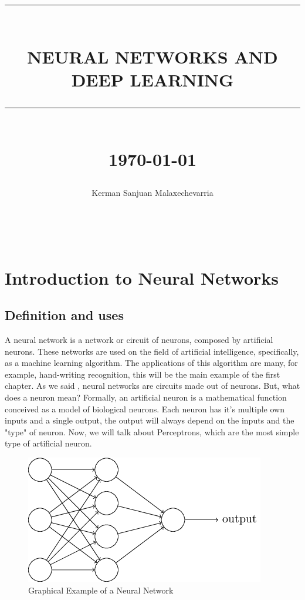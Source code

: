 \documentclass[12pt]{report}
\newcommand{\HRule}[1]{\rule{\linewidth}{#1}}
\begin{document}
\title{ \normalsize \textsc{}
		\\ [1.0cm]
		\HRule{0.5pt} \\
		\LARGE \textbf{\uppercase{Neural Networks and Deep Learning}}
		\HRule{2pt} \\ [0.5cm]
		\normalsize \today \vspace*{5\baselineskip}}

\date{}
\author{
		Kerman Sanjuan Malaxechevarria \\
      }




\maketitle
\renewcommand{\contentsname}{Index}
\tableofcontents
\

\sectionfont{\scshape}


\chapter{Introduction to Neural Networks}
\section{Definition and uses}
A neural network is a network or circuit of neurons, composed by artificial neurons. These networks are used on the field of artificial intelligence, specifically, as a machine learning algorithm. The applications of this algorithm are many, for example, hand-writing recognition, this will be the main example of the first chapter.  
As we said , neural networks are circuits made out of neurons. But, what does a neuron mean?  Formally, an artificial neuron is a mathematical function conceived as a model of biological neurons. Each neuron has it's multiple own inputs and a single output, the output will always depend on the inputs and the "type" of neuron. Now, we will talk about Perceptrons, which are the most simple type of artificial neuron.
\begin{figure}[h]
  \caption{Graphical Example of a Neural Network}
  \centering
      \includegraphics[scale=0.5]{Resources/single-neural-network.png}
\end{figure}
\newpage
\end{document}
